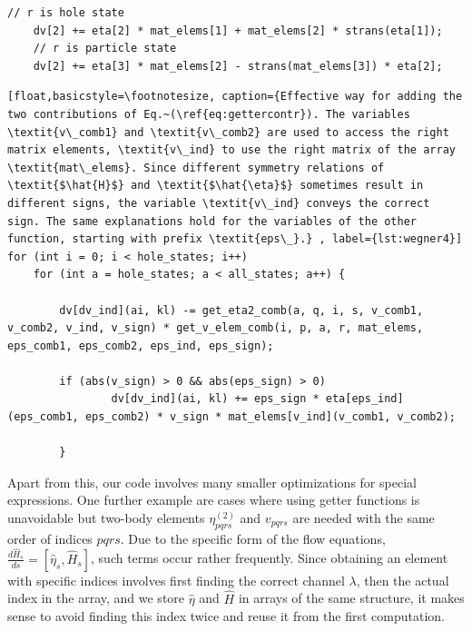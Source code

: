 \begin{lstlisting}[float,basicstyle=\footnotesize, caption={Further optimizing expression (\ref{eq:fphterm}) by using matrix-matrix multiplication. The function \textit{strans} is used from the Armadillo library and returns simple matrix transposes, without taking the conjugate of the elements. }, label={lst:wegner3}]
    // r is hole state
    dv[2] += eta[2] * mat_elems[1] + mat_elems[2] * strans(eta[1]);
    // r is particle state
    dv[2] += eta[3] * mat_elems[2] - strans(mat_elems[3]) * eta[2];
\end{lstlisting}

\begin{lstlisting}[float,basicstyle=\footnotesize, caption={Effective way for adding the two contributions of Eq.~(\ref{eq:gettercontr}). The variables \textit{v\_comb1} and \textit{v\_comb2} are used to access the right matrix elements, \textit{v\_ind} to use the right matrix of the array \textit{mat\_elems}. Since different symmetry relations of \textit{$\hat{H}$} and \textit{$\hat{\eta}$} sometimes result in different signs, the variable \textit{v\_ind} conveys the correct sign. The same explanations hold for the variables of the other function, starting with prefix \textit{eps\_}.} , label={lst:wegner4}]
for (int i = 0; i < hole_states; i++)
    for (int a = hole_states; a < all_states; a++) {

        dv[dv_ind](ai, kl) -= get_eta2_comb(a, q, i, s, v_comb1, v_comb2, v_ind, v_sign) * get_v_elem_comb(i, p, a, r, mat_elems, eps_comb1, eps_comb2, eps_ind, eps_sign);

        if (abs(v_sign) > 0 && abs(eps_sign) > 0)
                dv[dv_ind](ai, kl) += eps_sign * eta[eps_ind](eps_comb1, eps_comb2) * v_sign * mat_elems[v_ind](v_comb1, v_comb2);

        }
\end{lstlisting}

Apart from this, our code involves many smaller optimizations for special expressions. One further example are
  cases where using getter functions is unavoidable but two-body elements $\eta_{pqrs}^{(2)}$ and $v_{pqrs}$ are needed with the same order of indices $pqrs$. Due to the specific form of the flow equations, $\frac{d \hat{H}_s}{ds} = \left[\hat{\eta}_s, \hat{H}_s \right]$, such terms occur rather frequently. Since obtaining an element with specific indices involves first finding the correct channel $\lambda$, then the actual index in the array, and we store $\hat{\eta}$ and $\hat{H}$ in arrays of the same structure, it makes sense to avoid finding this index twice and reuse it from the first computation.

